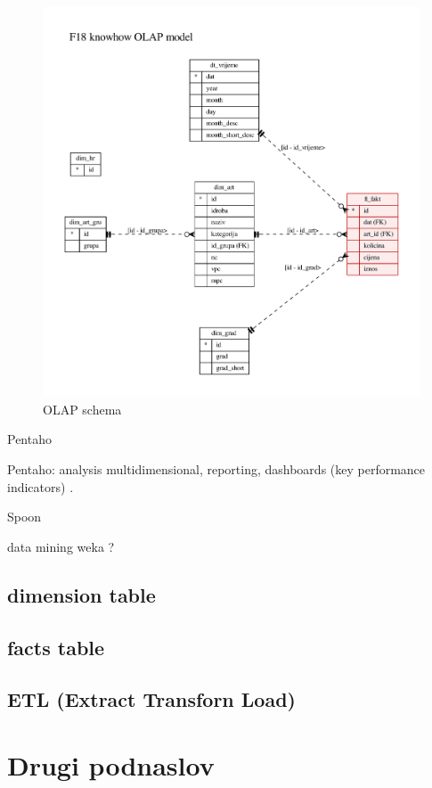 \documentclass[times, utf8, seminar]{fit}
\begin{document}
\begin{figure}
\centering
\includegraphics[width=14cm]{img/F18_olap.pdf}
\caption{OLAP schema}
\end{figure}


Pentaho

Pentaho: analysis multidimensional, reporting, dashboards (key performance indicators) \cite[str.~7]{pentaho32}.

Spoon

data mining weka ?


\subsection{dimension table}

\subsection{facts table}



\subsection{ETL (Extract Transforn Load)}




\section{Drugi podnaslov}
\end{document}
